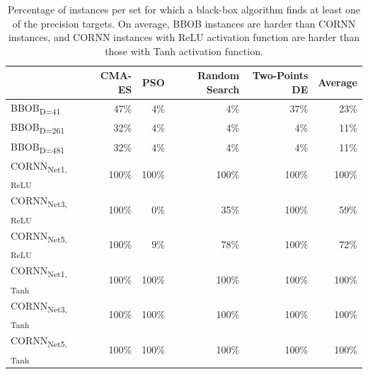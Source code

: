 \documentclass[acmsmall,screen,review,anonymous]{acmart}
\begin{document}
\begin{table}[!t]
    \caption{Percentage of instances per set for which a black-box algorithm finds at least one of the precision targets. On average, BBOB instances are harder than CORNN instances, and CORNN instances with ReLU activation function are harder than those with Tanh activation function.}
    \label{tab:finds_targets}
    \footnotesize
    \begin{tabular}{lrrrrr}
        \toprule
                                               & CMA-ES   & PSO   & Random Search & Two-Points DE & Average \\
        \midrule
        BBOB\textsubscript{D=41}               & 47\%  & 4\%   & 4\%          & 37\%        & 23\%    \\
        BBOB\textsubscript{D=261}              & 32\%  & 4\%   & 4\%          & 4\%         & 11\%    \\
        BBOB\textsubscript{D=481}              & 32\%  & 4\%   & 4\%          & 4\%         & 11\%    \\
        CORNN\textsubscript{Net1, ReLU%
        } & 100\% & 100\% & 100\%        & 100\%       & 100\%   \\
        CORNN\textsubscript{Net3, ReLU%
        } & 100\% & 0\%   & 35\%         & 100\%       & 59\%    \\
        CORNN\textsubscript{Net5, ReLU%
        } & 100\% & 9\%   & 78\%         & 100\%       & 72\%    \\
        CORNN\textsubscript{Net1, Tanh%
        } & 100\% & 100\% & 100\%        & 100\%       & 100\%   \\
        CORNN\textsubscript{Net3, Tanh%
        } & 100\% & 100\% & 100\%        & 100\%       & 100\%   \\
        CORNN\textsubscript{Net5, Tanh%
        } & 100\% & 100\% & 100\%        & 100\%       & 100\%   \\
        \bottomrule
    \end{tabular}
\end{table}
%
\end{document}
